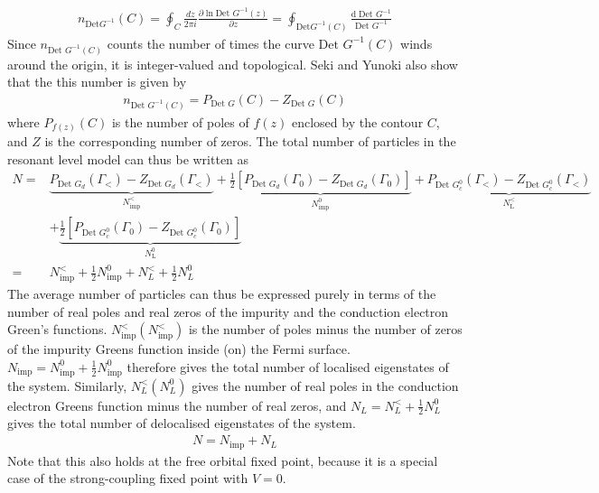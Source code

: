 \documentclass{report}
\numberwithin{equation}{section}
\begin{document}
\begin{equation}\begin{aligned}
	n_{\text{Det} G^{-1}}(C) = \oint_{C} \frac{dz}{2\pi i} \frac{\partial{\ln\text{Det }G^{-1}(z)}}{\partial{z}} = \oint_{\text{Det} G^{-1}(C)} \frac{\mathrm{d}\; \text{Det }G^{-1}}{\text{Det }G^{-1}}
\end{aligned}\end{equation}
Since \(n_{\text{Det } G^{-1}(C)}\) counts the number of times the curve \(\text{Det } G^{-1}(C)\) winds around the origin, it is integer-valued and topological. Seki and Yunoki also show that the this number is given by
\begin{equation}\begin{aligned}
n_{\text{Det }G^{-1}(C)} = P_{\text{Det }G}(C) - Z_{\text{Det }G}(C)
\end{aligned}\end{equation}
where \(P_{f(z)}(C)\) is the number of poles of \(f(z)\) enclosed by the contour \(C\), and \(Z\) is the corresponding number of zeros. The total number of particles in the resonant level model can thus be written as
\begin{equation}\begin{aligned}
	N =& \underbrace{P_{\text{Det }G_d}(\Gamma_<) - Z_{\text{Det }G_d}(\Gamma_<)}_{N_\text{imp}^<} + \underbrace{\frac{1}{2}\left[P_{\text{Det }G_d}(\Gamma_0) - Z_{\text{Det }G_d}(\Gamma_0)\right]}_{N_\text{imp}^0} + \underbrace{P_{\text{Det }G_{c}^{0}}(\Gamma_<) - Z_{\text{Det }G_{c}^{0}}(\Gamma_<)}_{N_\text{L}^<} \\
	  &+ \underbrace{\frac{1}{2}\left[P_{\text{Det }G_{c}^{0}}(\Gamma_0) - Z_{\text{Det }G_{c}^{0}}(\Gamma_0)\right]}_{N_\text{L}^0}\\
	  =& N_\text{imp}^< + \frac{1}{2}N_\text{imp}^0 + N_L^< + \frac{1}{2}N_L^0
\end{aligned}\end{equation}
The average number of particles can thus be expressed purely in terms of the number of real poles and real zeros of the impurity and the conduction electron Green's functions. \(N_\text{imp}^<\left(N_\text{imp}^<\right)\) is the number of poles minus the number of zeros of the impurity Greens function inside (on) the Fermi surface. \(N_\text{imp} = N_\text{imp}^0 + \frac{1}{2}N_\text{imp}^0\)  therefore gives the total number of localised eigenstates of the system. Similarly, \(N_L^<\left( N_L^0 \right) \) gives the number of real poles in the conduction electron Greens function minus the number of real zeros, and \(N_L = N_L^< + \frac{1}{2}N_L^0\) gives the total number of delocalised eigenstates of the system.
\begin{equation}\begin{aligned}
	\label{total_lutt}
	N = N_\text{imp} + N_L
\end{aligned}\end{equation}
Note that this also holds at the free orbital fixed point, because it is a special case of the strong-coupling fixed point with \(V=0\).
\end{document}
